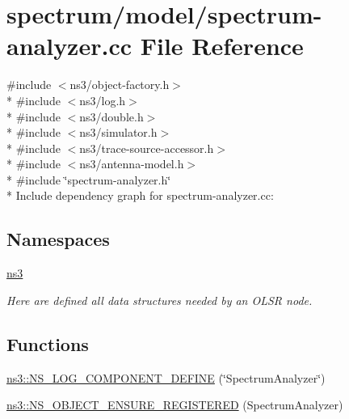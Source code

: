 \hypertarget{spectrum-analyzer_8cc}{}\section{spectrum/model/spectrum-\/analyzer.cc File Reference}
\label{spectrum-analyzer_8cc}
{\ttfamily \#include $<$ns3/object-\/factory.\+h$>$}\\*
{\ttfamily \#include $<$ns3/log.\+h$>$}\\*
{\ttfamily \#include $<$ns3/double.\+h$>$}\\*
{\ttfamily \#include $<$ns3/simulator.\+h$>$}\\*
{\ttfamily \#include $<$ns3/trace-\/source-\/accessor.\+h$>$}\\*
{\ttfamily \#include $<$ns3/antenna-\/model.\+h$>$}\\*
{\ttfamily \#include \char`\"{}spectrum-\/analyzer.\+h\char`\"{}}\\*
Include dependency graph for spectrum-\/analyzer.cc\+:
\subsection*{Namespaces}
\begin{DoxyCompactItemize}
\item 
 \hyperlink{namespacens3}{ns3}
\begin{DoxyCompactList}\small\item\em Here are defined all data structures needed by an O\+L\+SR node. \end{DoxyCompactList}\end{DoxyCompactItemize}
\subsection*{Functions}
\begin{DoxyCompactItemize}
\item 
\hyperlink{namespacens3_a9c860bc33d3cc5daf0e7a0151af902b8}{ns3\+::\+N\+S\+\_\+\+L\+O\+G\+\_\+\+C\+O\+M\+P\+O\+N\+E\+N\+T\+\_\+\+D\+E\+F\+I\+NE} (\char`\"{}Spectrum\+Analyzer\char`\"{})
\item 
\hyperlink{namespacens3_ace1b448da003f06a981f5692f0a586d3}{ns3\+::\+N\+S\+\_\+\+O\+B\+J\+E\+C\+T\+\_\+\+E\+N\+S\+U\+R\+E\+\_\+\+R\+E\+G\+I\+S\+T\+E\+R\+ED} (Spectrum\+Analyzer)
\end{DoxyCompactItemize}

